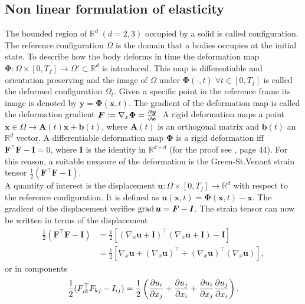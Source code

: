 \subsection{Non linear formulation of elasticity}
The bounded region of $\mathbb{R}^d \; (d=2, 3)$ occupied by a solid is called configuration. The reference configuration $\Omega$ is the domain that a bodies occupies at the initial state. To describe how the body deforms in time the deformation map $\bm\Phi: \Omega \times [0, T_f] \rightarrow \Omega' \subset \mathbb{R}^d$ is introduced. This map is differentiable and orientation preserving and the image of $\Omega$ under $\bm\Phi(\cdot, t) \; \forall t \in [0, T_f]$ is called the deformed configuration $\Omega_t$. Given a specific point in the reference frame its image is denoted by $\bm{y} = \bm{\Phi}(\bm{x}, t)$. The gradient of the deformation map is called the deformation gradient $\bm{F}:=\nabla_x\bm{\Phi} = \diffp{\bm{y}}{\bm{x}}$. A rigid deformation maps a point $\bm{x} \in \Omega \rightarrow \bm{A}(t) \bm{x} + \bm{b}(t)$, where $\bm{A}(t)$ is an orthogonal matrix and $\bm{b}(t)$ an $\mathbb{R}^d$ vector. A differentiable deformation map $\bm\Phi$ is a rigid deformation iff $\bm{F}^\top \bm{F} - \bm{I} = 0$,  where $\bm{I}$ is the identity in $\mathbb{R}^{d\times d}$ (for the proof see \cite{ciarlet1988mathematical}, page 44). For this reason, a suitable measure of the deformation is the Green-St.Venant strain tensor $\frac{1}{2} (\bm{F}^\top \bm{F} - \bm{I})$.  \\
A quantity of interest is the displacement $\bm{u}: \Omega \times [0, T_f] \rightarrow \mathbb{R}^d$ with respect to the reference configuration. It is defined as $\bm{u}(\bm{x}, t) = \bm{\Phi}(\bm{x}, t) - \bm{x}$. The gradient of the displacement verifies $\operatorname*{grad}\bm{u} = \bm{F} - \bm{I}$. The strain tensor can now be written in terms of the displacement
\begin{equation*}
\begin{aligned}
\frac{1}{2} (\bm{F}^\top \bm{F} - \bm{I}) &= \frac{1}{2}\left[(\nabla_x \bm{u} + \bm{I})^\top (\nabla_x \bm{u} + \bm{I}) - \bm{I}\right] \\
&= \frac{1}{2}\left[\nabla_x \bm{u} + (\nabla_x \bm{u})^\top + (\nabla_x \bm{u})^\top (\nabla_x \bm{u})\right],
\end{aligned}
\end{equation*}
or in components \[
\frac{1}{2} ({F}_{ik}^\top {F}_{kj} - {I}_{ij}) = \frac{1}{2} \left(\diffp{u_i}{x_j} + \diffp{u_j}{x_i} + \diffp{u_i}{x_j}\diffp{u_j}{x_i}\right).
\]

